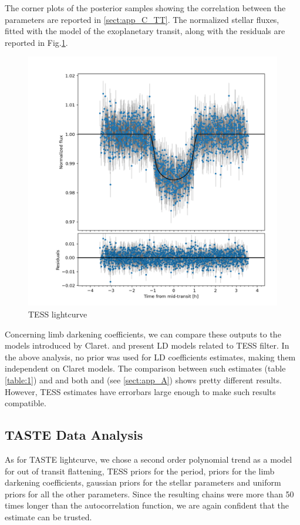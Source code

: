 \documentclass{aa}
\begin{document}
The corner plots of the posterior samples showing the correlation between 
the parameters are reported in \ref{sect:app_C_TT}.
The normalized stellar fluxes, fitted with the model of the exoplanetary 
transit, along with the residuals are reported in Fig.\ref{fig: lc1}.
\begin{figure}[h!]
    \hspace{-20pt}
    \centering
    \includegraphics[scale=0.25, angle=0]{pictures/lctess.png}
    \caption{TESS lightcurve}
   \label{fig: lc1}
\end{figure}
Concerning limb darkening coefficients, we can compare these outputs to the models introduced by Claret. \cite{claret2017} and \cite{claret2018} present LD models related to TESS filter. In the above analysis, no prior was used for LD coefficients estimates, making them independent on Claret models. The comparison between such estimates (table \ref{table:1}) and and both \cite{claret2017} and \cite{claret2018} (see \ref{sect:app_A}) shows pretty different results. However, TESS estimates have errorbars large enough to make such results compatible. 


\subsection{TASTE Data Analysis}
As for TASTE lightcurve, we chose a second order 
polynomial trend as a model for out of transit flattening, TESS 
priors for the period, \cite{claret2011} priors for the limb darkening coefficients, gaussian priors for the stellar 
parameters and uniform priors for all the other parameters. Since the resulting chains were more than 50 times longer than the 
autocorrelation function, we are again confident that the estimate can be trusted.
\end{document}
